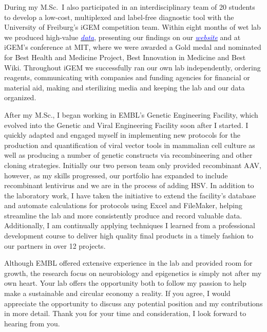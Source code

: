 \documentclass[11pt,a4paper,sans]{moderncv}
\begin{document}
\begin{spacing}{1.15}
During my M.Sc.\ I also participated in an interdisciplinary team of 20 students to develop a low-cost, multiplexed and label-free diagnostic tool with the University of Freiburg's iGEM competition team.
Within eight months of wet lab we produced high-value {\href{https://www.ncbi.nlm.nih.gov/pubmed/29803867}{\textcolor{blue}{\textit{data}}}}, presenting our findings on our {\href{http://2015.igem.org/Team:Freiburg/Home_Intro}{\textcolor{blue}{\textit{website}}}} and at iGEM's conference at MIT, where we were awarded a Gold medal and nominated for Best Health and Medicine Project, Best Innovation in Medicine and Best Wiki.
Throughout iGEM we successfully ran our own lab independently, ordering reagents, communicating with companies and funding agencies for financial or material aid, making and sterilizing media and keeping the lab and our data organized.\par%
		
After my M.Sc., I began working in EMBL's Genetic Engineering Facility, which evolved into the Genetic and Viral Engineering Facility soon after I started. 
I quickly adapted and engaged myself in implementing new protocols for the production and quantification of viral vector tools in mammalian cell culture as well as producing a number of genetic constructs via recombineering and other cloning strategies.
Initially our two person team only provided recombinant AAV, however, as my skills progressed, our portfolio has expanded to include recombinant lentivirus and we are in the process of adding HSV.
 In addition to the laboratory work, I have taken the initiative to extend the facility's database and automate calculations for protocols using Excel and FileMaker, helping streamline the lab and more consistently produce and record valuable data.
Additionally, I am continually applying techniques I learned from a professional development course to deliver high quality final products in a timely fashion to our partners in over 12 projects.\par%

Although EMBL offered extensive experience in the lab and provided room for growth, the research focus on neurobiology and epigenetics is simply not after my own heart.
Your lab offers the opportunity both to follow my passion to help make a sustainable and circular economy a reality. 
If you agree, I would appreciate the opportunity to discuss any potential position and my contributions in more detail. 
Thank you for your time and consideration, I look forward to hearing from you.

\end{spacing}
\makeletterclosing
\end{document}
